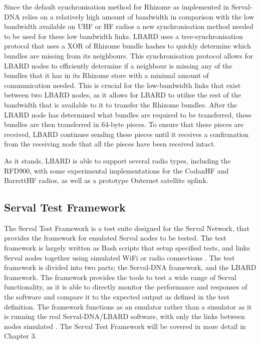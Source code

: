 Since the default synchronisation method for Rhizome as implemented in Serval-DNA relies on a relatively high amount of bandwidth in comparison with the low bandwidth available on UHF or HF radios a new synchronisation method needed to be used for these low bandwidth links.
LBARD uses a tree-synchronisation protocol that uses a XOR of Rhizome bundle hashes to quickly determine which bundles are missing from its neighbours. 
This synchronisation protocol allows for LBARD nodes to efficiently determine if a neighbour is missing any of the bundles that it has in its Rhizome store with a minimal amount of communication needed.
This is crucial for the low-bandwidth links that exist between two LBARD nodes, as it allows for LBARD to utilise the rest of the bandwidth that is available to it to transfer the Rhizome bundles. 
After the LBARD node has determined what bundles are required to be transferred, these bundles are then transferred in 64-byte pieces.
To ensure that these pieces are received, LBARD continues sending these pieces until it receives a confirmation from the receiving node that all the pieces have been received intact.

As it stands, LBARD is able to support several radio types, including the RFD900, with some experimental implementations for the CodanHF and BarrettHF radios, as well as a prototype Outernet satellite uplink.


\subsection{Serval Test Framework}
The Serval Test Framework is a test suite designed for the Serval Network, that provides the framework for emulated Serval nodes to be tested.
The test framework is largely written as Bash scripts that setup specified tests, and links Serval nodes together using simulated WiFi or radio connections \parencite{servalTestDocumentation}.
The test framework is divided into two parts; the Serval-DNA framework, and the LBARD framework.
The framework provides the tools to test a wide range of Serval functionality, as it is able to directly monitor the performance and responses of the software and compare it to the expected output as defined in the test definition.
The framework functions as an emulator rather than a simulator as it is running the real Serval-DNA/LBARD software, with only the links between nodes simulated \parencite{servalTestDocumentation}.
The Serval Test Framework will be covered in more detail in Chapter 3.

